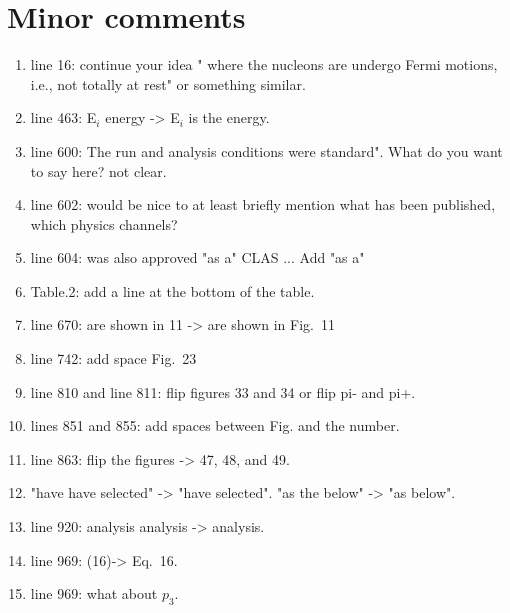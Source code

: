 \documentclass[a4paper,11pt,twoside]{article}
\begin{document}
\section{Minor comments}

\begin{enumerate}
   \item line 16: continue your idea " where the nucleons are undergo Fermi 
      motions, i.e., not totally at rest" or something similar. 

   \item line 463: E$_i$ energy -> E$_i$ is the energy.

   \item line 600: The run and analysis conditions were standard". What do you 
      want to say here? not clear.

   \item line 602: would be nice to at least briefly mention what has been 
      published, which physics channels?

   \item line 604: was also approved "as a" CLAS ... Add "as a"

   \item Table.2: add a line at the bottom of the table.

   \item line 670: are shown in 11 -> are shown in Fig.~11

   \item line 742: add space Fig.~23

   \item line 810 and line 811: flip figures 33 and 34 or flip pi- and pi+.  

   \item lines 851 and 855: add spaces between Fig. and the number.

   \item line 863: flip the figures -> 47, 48, and 49.

   \item "have have selected" -> "have selected". "as the below" -> "as below".

   \item line 920: analysis analysis -> analysis.

   \item line 969: (16)-> Eq.~16.

   \item line 969: what about $p_3$.

\end{enumerate}
\end{document}
